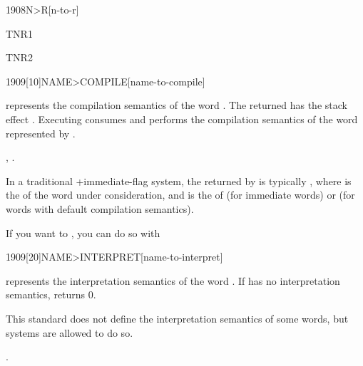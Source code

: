 \begin{worddef}[NtoR]{1908}{N>R}[n-to-r]
	\begin{testing} %
		\word{:} TNR1    \word{;} \\

		\word{:} TNR2      \word{;} \\
	\end{testing}
\end{worddef}


\begin{worddef}[NAMEtoCOMPILE]{1909}[10]{NAME>COMPILE}[name-to-compile]%
\item {}

	 represents the compilation semantics of the word
	.  The returned  has the stack effect
	.  Executing  consumes
	 and performs the compilation semantics of the word
	represented by .

\see
	,
	.

	\begin{rationale}
		In a traditional +immediate-flag system, the
		 returned by  is
		typically , where  is the
		 of the word under consideration, and
		 is the  of 
		(for immediate words) or  (for words
		with default compilation semantics).

		If you want to  , you can
		do so with

		\begin{quote}\ttfamily
			  
			 
		\end{quote}
  	\end{rationale} 
\end{worddef}


\begin{worddef}[NAMEtoINTERPRET]{1909}[20]{NAME>INTERPRET}[name-to-interpret]%
\item {}

	 represents the interpretation semantics of the word
	.  If  has no interpretation semantics,
	 returns 0.

\note
	This standard does not define the interpretation semantics of
	some words, but systems are allowed to do so.
 
\see {}.
\end{worddef}


